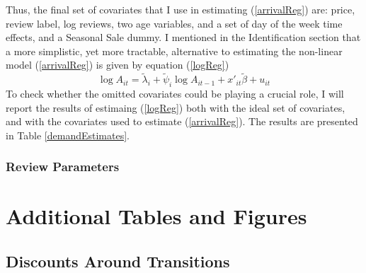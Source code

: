 \documentclass[12pt,pagebackref]{article}
\begin{document}
Thus, the final set of covariates that I use in estimating
(\ref{arrivalReg}) are: price, review label, log reviews, two age
variables, and a set of day of the week time effects, and a Seasonal
Sale dummy. I mentioned in the Identification section that a more
simplistic, yet more tractable, alternative to estimating the non-linear
model (\ref{arrivalReg}) is given by equation (\ref{logReg}) \[
\log A_{it} = \tilde\lambda_i + \tilde\psi_i \log A_{it-1} + x'_{it}\tilde \beta + u_{it}
\] \noindent To check whether the omitted covariates could be playing a
crucial role, I will report the results of estimaing (\ref{logReg}) both
with the ideal set of covariates, and with the covariates used to
estimate (\ref{arrivalReg}). The results are presented in Table
\ref{demandEstimates}.

\hypertarget{review-parameters-1}{%
\subsubsection{Review Parameters}\label{review-parameters-1}}

\newpage
\appendix

\hypertarget{additional-tables-and-figures}{%
\section{Additional Tables and
Figures}\label{additional-tables-and-figures}}

\hypertarget{discounts-around-transitions}{%
\subsection{Discounts Around
Transitions}\label{discounts-around-transitions}}
\end{document}
